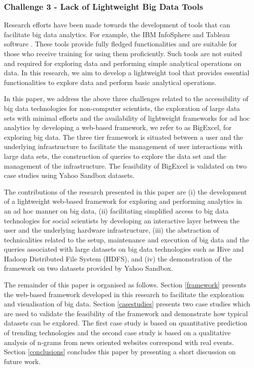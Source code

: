\documentclass[10pt, conference, compsocconf]{IEEEtran}
\begin{document}
\subsubsection*{Challenge 3 - Lack of Lightweight Big Data Tools}
Research efforts have been made towards the development of tools that can facilitate big data analytics. For example, the IBM InfoSphere \cite{ibminfosphere} and Tableau software \cite{tableau}. These tools provide fully fledged functionalities and are suitable for those who receive training for using them proficiently. Such tools are not suited and required for exploring data and performing simple analytical operations on data. In this research, we aim to develop a lightweight tool that provides essential functionalities to explore data and perform basic analytical operations. 

In this paper, we address the above three challenges related to the accessibility of big data technologies for non-computer scientists, the exploration of large data sets with minimal efforts and the availability of lightweight frameworks for ad hoc analytics by developing a web-based framework, we refer to as BigExcel, for exploring big data. The three tier framework is situated between a user and the underlying infrastructure to facilitate the management of user interactions with large data sets, the construction of queries to explore the data set and the management of the infrastructure. The feasibility of BigExcel is validated on two case studies using Yahoo Sandbox \cite{yahoosandbox} datasets.   

The contributions of the research presented in this paper are (i) the development of a lightweight web-based framework for exploring and performing analytics in an ad hoc manner on big data, (ii) facilitating simplified access to big data technologies for social scientists by developing an interactive layer between the user and the underlying hardware infrastructure, (iii) the abstraction of technicalities related to the setup, maintenance and execution of big data and the queries associated with large datasets on big data technologies such as Hive and Hadoop Distributed File System (HDFS), and (iv) the demonstration of the framework on two datasets provided by Yahoo Sandbox.  

The remainder of this paper is organised as follows. Section \ref{framework} presents the web-based framework developed in this research to facilitate the exploration and visualisation of big data. Section \ref{casestudies} presents two case studies which are used to validate the feasibility of the framework and demonstrate how typical datasets can be explored. The first case study is based on quantitative prediction of trending technologies and the second case study is based on a qualitative analysis of n-grams from news oriented websites correspond with real events. Section \ref{conclusions} concludes this paper by presenting a short discussion on future work. 
\end{document}
